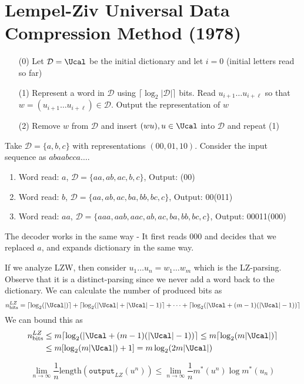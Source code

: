 \section{Lempel-Ziv Universal Data Compression Method (1978)}
\begin{enumerate}
    \item[(0)] Let $\mathcal{D} = \Ucal$ be the initial dictionary and let $i = 0$ (initial letters read so far)
    \item[(1)] Represent a word in $\mathcal{D}$ using $\lceil \log_2|\mathcal{D}|\rceil$ bits. Read $u_{i+1} \dots u_{i+\ell}$ so that $w = (u_{i+1}\dots u_{i+\ell}) \in \mathcal{D}$. Output the representation of $w$
    \item[(2)] Remove $w$ from $\mathcal{D}$ and insert $(wu), u \in \Ucal$ into $\mathcal{D}$ and repeat (1)
\end{enumerate} 
\begin{eg}
Take $\mathcal{D} = \{a,b,c\}$ with representations $(00, 01, 10)$. Consider the input sequence as $abaabcca\dots$. 
\begin{enumerate}
    \item Word read: $a$, $\mathcal{D} = \{aa, ab, ac, b, c\}$, Output: (00)
    \item Word read: $b$, $\mathcal{D} = \{aa, ab, ac, ba, bb, bc, c\}$, Output: 00(011)
    \item Word read: $aa$, $\mathcal{D} = \{aaa, aab, aac, ab, ac, ba, bb, bc, c\}$, Output: 00011(000)
\end{enumerate}
The decoder works in the same way - It first reads $000$ and decides that we replaced $a$, and expands dictionary in the same way.
\end{eg}
If we analyze LZW, then consider $u_1\dots u_n = w_1\dots w_m$ which is the LZ-parsing. Observe that it is a distinct-parsing since we never add a word back to the dictionary. We can calculate the number of produced bits as
\[n^{LZ}_{\text{bits}} = \lceil \log_2( |\Ucal| )\rceil + \lceil \log_2( |\Ucal| + |\Ucal|-1 )\rceil + \cdots + \lceil \log_2( |\Ucal + (m-1)(|\Ucal| - 1) )\rceil \]
We can bound this as
\begin{align*}
    n^{LZ}_{\text{bits}} &\leq m \lceil \log_2(|\Ucal + (m-1)(|\Ucal| - 1))\rceil \leq m \lceil\log_2(m|\Ucal|) \rceil \\
    &\leq m [\log_2(m|\Ucal|) + 1] = m\log_2 (2m|\Ucal|)
\end{align*}
\begin{theorem}
\[ \lim_{n\to\infty} \frac{1}{n} \text{length}(\texttt{output}_{LZ}(u^n)) \leq \lim_{n\to\infty} \frac{1}{n} m^*(u^n)\log m^*(u_n)\]
\end{theorem}
